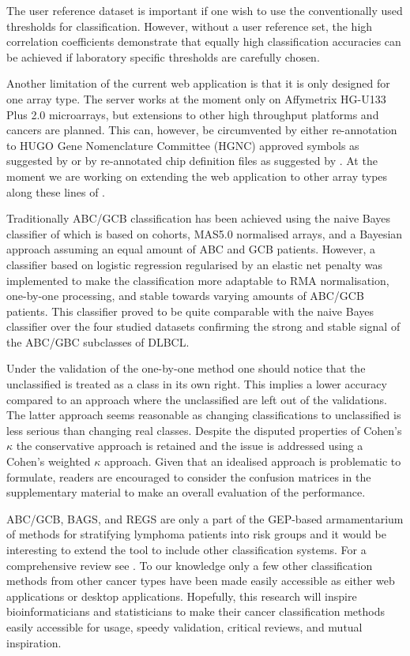 \documentclass{bmcart}
\begin{document}
The user reference dataset is important if one wish to use the conventionally used thresholds for classification.
However, without a user reference set, the high correlation coefficients demonstrate that equally high classification accuracies can be achieved if laboratory specific thresholds are carefully chosen.

Another limitation of the current web application is that it is only designed for one array type.
The server works at the moment only on Affymetrix HG-U133 Plus 2.0 microarrays, but extensions to other high throughput platforms and cancers are planned.
This can, however, be circumvented by either re-annotation to HUGO Gene Nomenclature Committee (HGNC) approved symbols as suggested by \citet{Care2013} or by re-annotated chip definition files as suggested by \citep{Dai2005}.
At the moment we are working on extending the web application to other array types along these lines of \citep{Dai2005}.

Traditionally ABC/GCB classification has been achieved using the naive Bayes classifier of \citet{Wright2003} which is based on cohorts, MAS5.0 normalised arrays, and a Bayesian approach assuming an equal amount of ABC and GCB patients.
However, a classifier based on logistic regression regularised by an elastic net penalty was implemented to make the classification more adaptable to RMA normalisation, one-by-one processing, and stable towards varying amounts of ABC/GCB patients.
This classifier proved to be quite comparable with the naive Bayes classifier over the four studied datasets confirming the strong and stable signal of the ABC/GBC subclasses of DLBCL.

Under the validation of the one-by-one method one should notice that the unclassified is treated as a class in its own right.
This implies a lower accuracy compared to an approach where the unclassified are left out of the validations.
The latter approach seems reasonable as changing classifications to unclassified is less serious than changing real classes.
Despite the disputed properties of Cohen's $\kappa$ the conservative approach is retained and the issue is addressed using a Cohen's weighted $\kappa$ approach.
Given that an idealised approach is problematic to formulate, readers are encouraged to consider the confusion matrices in the supplementary material to make an overall evaluation of the performance.

ABC/GCB, BAGS, and REGS are only a part of the GEP-based armamentarium of methods for stratifying lymphoma patients into risk groups \citep{Shipp2002, Lossos2004a, Malumbres2008} and it would be interesting to extend the tool to include other classification systems.
For a comprehensive review see \citep{Coutinho2013}.
To our knowledge only a few other classification methods from other cancer types have been made easily accessible as either web applications or desktop applications.
Hopefully, this research will inspire bioinformaticians and statisticians to make their cancer classification methods easily accessible for usage, speedy validation, critical reviews, and mutual inspiration.
\end{document}

